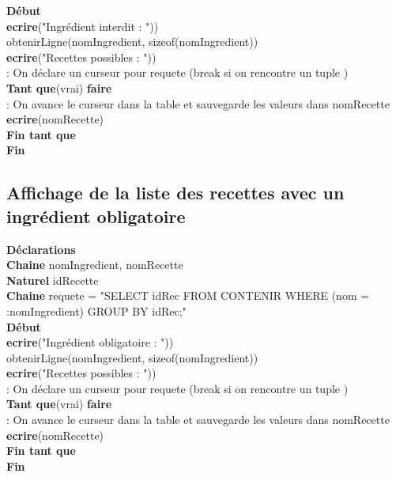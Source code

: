 \documentclass[a4paper,10pt]{report}
\begin{document}
\textbf{Début}\\
	\indent\indent \textbf{ecrire}("Ingrédient interdit : "))\\
	\indent \indent obtenirLigne(nomIngredient, sizeof(nomIngredient))\\
		\indent\indent \textbf{ecrire}("Recettes possibles : "))\\
	\indent\indent {} : On déclare un curseur pour requete (break si on rencontre un tuple )\\
	\indent\indent\textbf{Tant que}(vrai) \textbf{faire}\\
		\indent\indent\indent {} : On avance le curseur dans la table  et sauvegarde les valeurs dans nomRecette\\
	\indent\indent \indent \textbf{ecrire}(nomRecette)\\
	\indent\indent\textbf{Fin tant que}\\	
\indent\textbf{Fin}\\	



\subsection{Affichage de la liste des recettes avec un ingrédient obligatoire}

\textbf{Déclarations}\\
	\indent\indent\textbf{Chaine} nomIngredient, nomRecette\\
	\indent\indent\textbf{Naturel} idRecette\\	
\indent \indent \textbf{Chaine} requete = "SELECT idRec FROM CONTENIR WHERE (nom = :nomIngredient) 
\indent\indent GROUP BY idRec;"\\

\textbf{Début}\\
	\indent\indent \textbf{ecrire}("Ingrédient obligatoire : "))\\
	\indent \indent obtenirLigne(nomIngredient, sizeof(nomIngredient))\\
	\indent\indent \textbf{ecrire}("Recettes possibles : "))\\
	\indent\indent {} : On déclare un curseur pour requete (break si on rencontre un tuple )\\
	\indent\indent\textbf{Tant que}(vrai) \textbf{faire}\\
		\indent\indent\indent {} : On avance le curseur dans la table  et sauvegarde les valeurs dans nomRecette\\
	\indent\indent \indent \textbf{ecrire}(nomRecette)\\
	\indent\indent\textbf{Fin tant que}\\	
\indent\textbf{Fin}\\	
\end{document}
